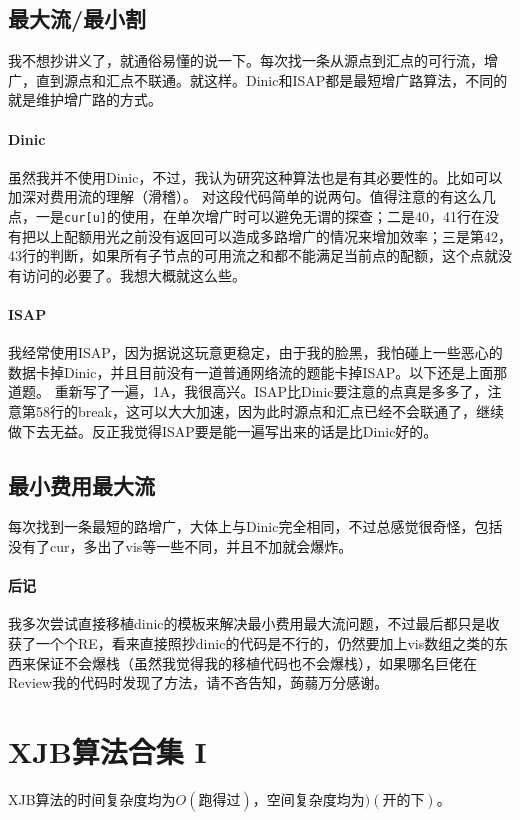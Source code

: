 \documentclass[]{cpp}
\begin{document}
\subsection{最大流/最小割} 我不想抄讲义了，就通俗易懂的说一下。每次找一条从源点到汇点的可行流，增广，直到源点和汇点不联通。就这样。Dinic和ISAP都是最短增广路算法，不同的就是维护增广路的方式。
\paragraph{Dinic} 虽然我并不使用Dinic，不过，我认为研究这种算法也是有其必要性的。比如可以加深对费用流的理解（滑稽）。
	对这段代码简单的说两句。值得注意的有这么几点，一是\verb|cur[u]|的使用，在单次增广时可以避免无谓的探查；二是40，41行在没有把以上配额用光之前没有返回可以造成多路增广的情况来增加效率；三是第42，43行的判断，如果所有子节点的可用流之和都不能满足当前点的配额，这个点就没有访问的必要了。我想大概就这么些。
\paragraph{ISAP} 我经常使用ISAP，因为据说这玩意更稳定，由于我的脸黑，我怕碰上一些恶心的数据卡掉Dinic，并且目前没有一道普通网络流的题能卡掉ISAP。以下还是上面那道题。
	重新写了一遍，1A，我很高兴。ISAP比Dinic要注意的点真是多多了，注意第58行的break，这可以大大加速，因为此时源点和汇点已经不会联通了，继续做下去无益。反正我觉得ISAP要是能一遍写出来的话是比Dinic好的。
\subsection{最小费用最大流} 每次找到一条最短的路增广，大体上与Dinic完全相同，不过总感觉很奇怪，包括没有了cur，多出了vis等一些不同，并且不加就会爆炸。
\paragraph{后记} 我多次尝试直接移植dinic的模板来解决最小费用最大流问题，不过最后都只是收获了一个个RE，看来直接照抄dinic的代码是不行的，仍然要加上vis数组之类的东西来保证不会爆栈（虽然我觉得我的移植代码也不会爆栈），如果哪名巨佬在Review我的代码时发现了方法，请不吝告知，蒟蒻万分感谢。
\section{XJB算法合集 I} XJB算法的时间复杂度均为$O(\mbox{跑得过})$，空间复杂度均为$)(\mbox{开的下})$。
\end{document}
